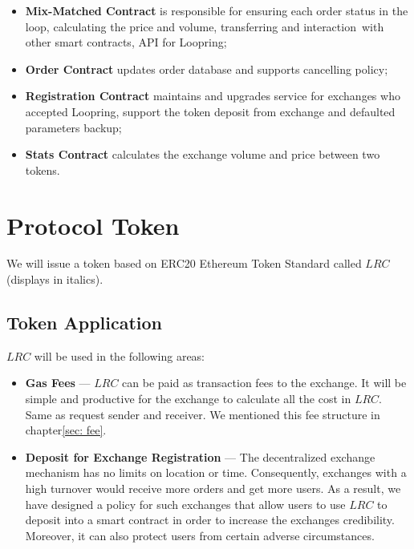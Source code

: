 \documentclass[UTF8,nofonts]{article}
\begin{document}
\begin{itemize}
 \item \textbf{Mix-Matched Contract} is responsible for ensuring each order status in the loop, calculating the price and volume,  transferring and interaction with other smart contracts, API for Loopring;
 \item  \textbf{Order Contract} updates order database and supports cancelling policy;
 \item \textbf{Registration Contract} maintains and upgrades service for exchanges who accepted Loopring, support the token deposit from exchange and defaulted parameters backup;
 \item \textbf{Stats Contract} calculates the exchange volume and price between two tokens.

\end{itemize}

\section{Protocol Token \label{sec: protocoltoken}}


We will issue a token based on ERC20 Ethereum Token Standard called $LRC$ (displays in italics).


\subsection{Token Application}

$LRC$ will be used in the following areas:

\begin{itemize}
 \item \textbf{Gas Fees} --- $LRC$ can be paid as transaction fees to the exchange. It will be simple and productive for the exchange to calculate all the cost in $LRC$. Same as request sender and receiver. We mentioned this fee structure in chapter\ref{sec: fee}.
 \item \textbf{Deposit for Exchange Registration} --- The decentralized exchange mechanism has no limits on location or time. Consequently, exchanges with a high turnover would receive more orders and get more users. As a result, we have designed a policy for such exchanges that allow users to use $LRC$ to deposit into a smart contract in order to increase the exchanges credibility. Moreover, it can also protect users from certain adverse circumstances.
\end{itemize}
\end{document}
